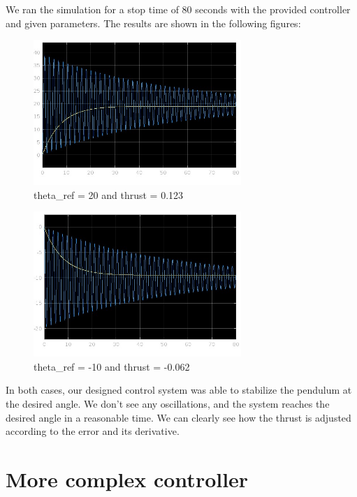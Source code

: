 \documentclass[12pt]{article}
\begin{document}
We ran the simulation for a stop time of 80 seconds with the provided controller and given parameters. The results are shown in the following figures:

\begin{figure}[h!]
    \centering
    \includegraphics[width=0.7\textwidth]{simulation1.jpg}
    \caption{theta\_ref = 20 and thrust = 0.123}
    \label{fig:simulation1}
\end{figure}
\vspace{1cm}

\begin{figure}[h!]
    \centering
    \includegraphics[width=0.7\textwidth]{simulation2.jpg}
    \caption{theta\_ref = -10 and thrust = -0.062}
    \label{fig:simulation2}
\end{figure}
\vspace{1cm}

In both cases, our designed control system was able to stabilize the pendulum at the desired angle. We don't see any oscillations, and the system reaches the desired angle in a reasonable time. We can clearly see how the thrust is adjusted according to the error and its derivative. 

\section{More complex controller}
\end{document}
